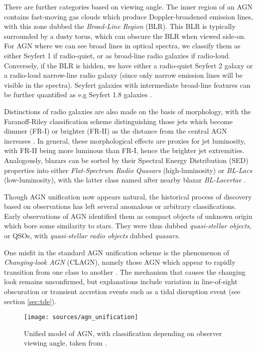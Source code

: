 There are further categories based on viewing angle. The inner region of an AGN contains fast-moving gas clouds which produce Doppler-broadened emission lines, with this zone dubbed the \emph{Broad-Line Region} (BLR). This BLR is typically surrounded by a dusty torus, which can obscure the BLR when viewed side-on. For AGN where we can see broad lines in optical spectra, we classify them as either Seyfert 1 if radio-quiet, or as broad-line radio galaxies if radio-loud. Conversely, if the BLR is hidden, we have either a radio-quiet Seyfert 2 galaxy or a radio-loud narrow-line radio galaxy (since only narrow emission lines will be visible in the spectra). Seyfert galaxies with intermediate broad-line features can be further quantified as e.g Seyfert 1.8 galaxies .

Distinctions of radio galaxies are also made on the basis of morphology, with the Faranoff-Riley classification scheme distinguishing those jets which become dimmer (FR-I) or brighter (FR-II) as the distance from the central AGN increases . In general, these morphological effects are proxies for jet luminosity, with FR-II being more luminous than FR-I, hence the brighter jet extremities. Analogously, blazars can be sorted by their Spectral Energy Distribution (SED) properties into either \emph{Flat-Spectrum Radio Quasars} (high-luminosity) or \emph{BL-Lacs} (low-luminosity), with the latter class named after nearby blazar \emph{BL-Lacertae} .

Though AGN unification now appears natural, the historical process of discovery based on observations has left several anomalous or arbitrary classifications. Early observations of AGN identified them as compact objects of unknown origin which bore some similarity to stars. They were thus dubbed \emph{quasi-stellar objects}, or QSOs, with \emph{quasi-stellar radio objects} dubbed \emph{quasars}. 

One misfit in the standard AGN unification scheme is the phenomenon of \emph{Changing-look AGN} (CLAGN), namely those AGN which appear to rapidly transition from one class to another . The mechanism that causes the changing look remains unconfirmed, but explanations include variation in line-of-sight obscuration or transient accretion events such as a tidal disruption event (see section \ref{sec:tde}).

\begin{figure}[!ht]
	\centering \texttt{[image: sources/agn\_unification]}
	\caption{Unified model of AGN, with classification depending on observer viewing angle, taken from \cite{2012agn..book.....B}.}
	\label{fig:agn_unification}
\end{figure}

